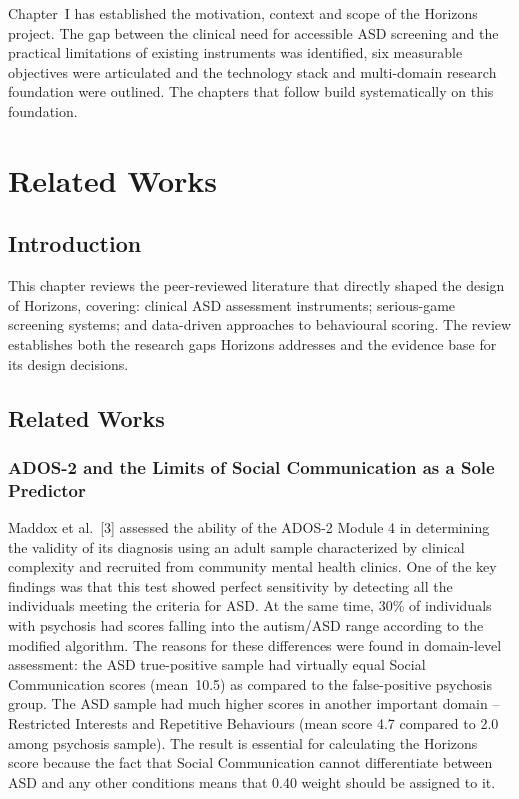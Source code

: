 \documentclass[12pt,a4paper,oneside]{report}
\begin{document}
Chapter~I has established the motivation, context and scope of the Horizons project. The gap between the clinical need for accessible ASD screening and the practical limitations of existing instruments was identified, six measurable objectives were articulated and the technology stack and multi-domain research foundation were outlined. The chapters that follow build systematically on this foundation.

\clearpage
\chapter{Related Works}

\section{Introduction}

This chapter reviews the peer-reviewed literature that directly shaped the design of Horizons, covering: clinical ASD assessment instruments; serious-game screening systems; and data-driven approaches to behavioural scoring. The review establishes both the research gaps Horizons addresses and the evidence base for its design decisions.

\section{Related Works}

\subsection{ADOS-2 and the Limits of Social Communication as a Sole Predictor}

Maddox et al.~[3] assessed the ability of the ADOS-2 Module 4 in determining the validity of its diagnosis using an adult sample characterized by clinical complexity and recruited from community mental health clinics. One of the key findings was that this test showed perfect sensitivity by detecting all the individuals meeting the criteria for ASD. At the same time, 30\% of individuals with psychosis had scores falling into the autism/ASD range according to the modified algorithm. The reasons for these differences were found in domain-level assessment: the ASD true-positive sample had virtually equal Social Communication scores (mean~10.5) as compared to the false-positive psychosis group. The ASD sample had much higher scores in another important domain – Restricted Interests and Repetitive Behaviours (mean score 4.7 compared to 2.0 among psychosis sample). The result is essential for calculating the Horizons score because the fact that Social Communication cannot differentiate between ASD and any other conditions means that 0.40 weight should be assigned to it.
\end{document}
